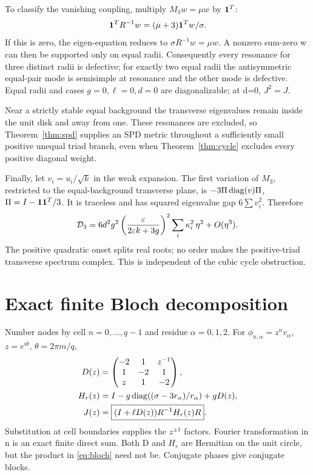 To classify the vanishing coupling, multiply \(M_3w=\mu w\) by \(\mathbf1^T\):
\[
\mathbf1^TR^{-1}w=(\mu+3)\mathbf1^Tw/\sigma .
\]
If this is zero, the eigen-equation reduces to \(\sigma R^{-1}w=\mu w\). A nonzero sum-zero w can then be supported only on equal radii. Consequently every resonance for three distinct radii is defective; for exactly two equal radii the antisymmetric equal-pair mode is semisimple at resonance and the other mode is defective. Equal radii and cases \(g=0,\ell=0,d=0\) are diagonalizable; at d=0, \(J^2=J\).

Near a strictly stable equal background the transverse eigenvalues remain inside the unit disk and away from one. These resonances are excluded, so Theorem~\ref{thm:spd} supplies an SPD metric throughout a sufficiently small positive unequal triad branch, even when Theorem~\ref{thm:cycle} excludes every positive diagonal weight.

Finally, let \(v_i=u_i/\sqrt{k}\) in the weak expansion. The first variation of \(M_3\), restricted to the equal-background transverse plane, is
\(-3\Pi\operatorname{diag}(v)\Pi\), \(\Pi=I-\mathbf1\mathbf1^T/3\). It is traceless and has squared eigenvalue gap \(6\sum v_i^2\). Therefore
\begin{equation}
\mathcal D_3=
6d^2g^2\left(\frac{\varepsilon}{2\varepsilon k+3g}\right)^2
\sum_i\kappa_i^2\,\eta^2+O(\eta^3).\label{eq:triadweak}
\end{equation}
The positive quadratic onset splits real roots; no order makes the positive-triad transverse spectrum complex. This is independent of the cubic cycle obstruction. 

\section{Exact finite Bloch decomposition}\label{sec:bloch}
Number nodes by cell \(n=0,\ldots,q-1\) and residue \(\alpha=0,1,2\). For
\(\phi_{n,\alpha}=z^nv_\alpha\), \(z=e^{i\theta}\), \(\theta=2\pi m/q\),
\begin{align}
D(z)&=\begin{pmatrix}-2&1&z^{-1}\\1&-2&1\\z&1&-2\end{pmatrix},\\
H_r(z)&=I-g\operatorname{diag}((\sigma-3r_\alpha)/r_\alpha)+gD(z),\\
J(z)&=\boxed{(I+\ell D(z))R^{-1}H_r(z)R}.\label{eq:bloch}
\end{align}
Substitution at cell boundaries supplies the \(z^{\pm1}\) factors. Fourier transformation in n is an exact finite direct sum. Both D and \(H_r\) are Hermitian on the unit circle, but the product in \eqref{eq:bloch} need not be. Conjugate phases give conjugate blocks.

